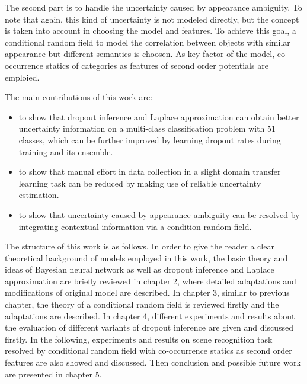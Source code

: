 The second part is to handle the uncertainty caused by appearance ambiguity. To note that again, this kind of uncertainty is not modeled directly, but the concept is taken into account in choosing the model and features. To achieve this goal, a conditional random field to model the correlation between objects with similar appearance but different semantics is choosen. As key factor of the model, co-occurrence statics of categories as features of second order potentials are emploied.

The main contributions of this work are:
\begin{itemize}
	\item to show that dropout inference and Laplace approximation can obtain better uncertainty information on a multi-class classification problem with 51 classes, which can be further improved by learning dropout rates during training and its ensemble.
	\item to show that manual effort in data collection in a slight domain transfer learning task can be reduced by making use of reliable uncertainty estimation.
	\item to show that uncertainty caused by appearance ambiguity can be resolved by integrating contextual information via a condition random field.
\end{itemize}

The structure of this work is as follows. In order to give the reader a clear theoretical background of models employed in this work, the basic theory and ideas of Bayesian neural network as well as dropout inference and Laplace approximation are briefly reviewed in chapter 2, where detailed adaptations and modifications of original model are described. In chapter 3, similar to previous chapter, the theory of a conditional random field is reviewed firstly and the adaptations are described. In chapter 4, different experiments and results about the evaluation of different variants of dropout inference are given and discussed firstly. In the following, experiments and results on scene recognition task resolved by conditional random field with co-occurrence statics as second order features are also showed and discussed. Then conclusion and possible future work are presented in chapter 5.

